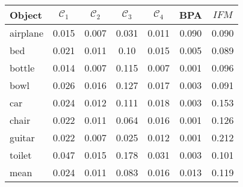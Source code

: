 \begin{center}
     \label{tab:distance7500} 
    \begin{tabular}{| l  | c | c | c | c | c | c |}
        \hline
        Object& $\mathcal{C}_1$ & $\mathcal{C}_2$ & $\mathcal{C}_3$ &$\mathcal{C}_4$ & BPA & $IFM$  \\ \hline
        airplane&0.015&0.007&0.031&0.011&0.090&0.090\\\hline
        bed&0.021&0.011&0.10&0.015&0.005&0.089\\\hline
        bottle&0.014&0.007&0.115&0.007&0.001&0.096\\\hline
        bowl&0.026&0.016&0.127&0.017&0.003&0.091\\\hline
        car&0.024&0.012&0.111&0.018&0.003&0.153\\\hline
        chair&0.022&0.011&0.064&0.016&0.001&0.126\\\hline
        guitar&0.022&0.007&0.025&0.012&0.001&0.212\\\hline
        toilet&0.047&0.015&0.178&0.031&0.003&0.101\\\hline\hline
        mean&0.024&0.011&0.083&0.016&0.013&0.119\\\hline
    \end{tabular}
\end{center}

